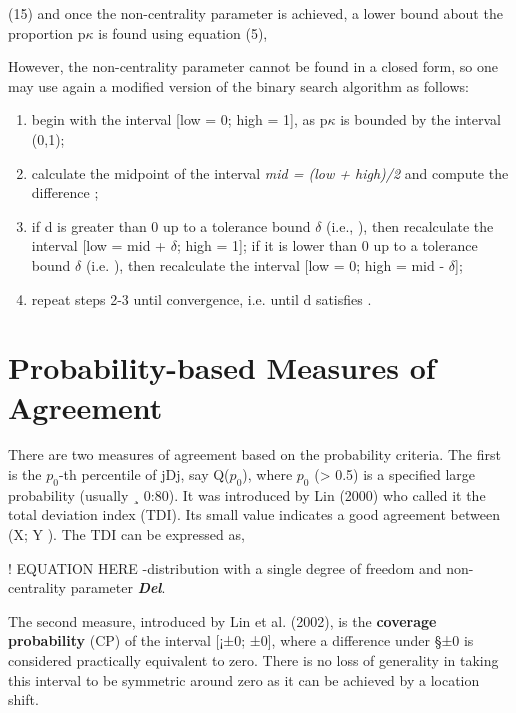 \documentclass[MAIN.tex]{subfiles}
\begin{document}
	(15)
	and once the non-centrality parameter  is achieved, a lower bound about the proportion p$\kappa$ is found using equation (5), 
	
	
	However, the non-centrality parameter cannot be found in a closed form, so one may use again a modified version of the binary search algorithm as follows:
	
	\begin{enumerate}
		\item begin with the interval [low = 0; high = 1], as p$\kappa$ is bounded by the interval (0,1);
		
		\item calculate the midpoint of the interval \textit{mid = (low + high)/2} and compute the difference ;
		
		\item if d is greater than 0 up to a tolerance bound $\delta$ (i.e., ), then recalculate the interval [low = mid + $\delta$; high = 1]; if it is 
		lower than 0 up to a tolerance bound $\delta$ (i.e. ), then recalculate the interval [low = 0; high = mid - $\delta$];
		
		\item repeat steps 2-3 until convergence, i.e. until d satisfies .
	\end{enumerate}
\newpage
\section{Probability-based Measures of Agreement}
There are two measures of agreement based on the probability criteria. The first is the
$p_0$-th percentile of jDj, say Q($p_0$), where $p_0$ (> 0.5) is a specified large probability (usually ¸ 0:80). 
It was introduced by Lin (2000) who called it the total deviation index (TDI). Its
small value indicates a good agreement between (X; Y ). The TDI can be expressed as,

! EQUATION HERE
-distribution with a single degree of freedom and non-centrality parameter \textbf{\textit{Del}}.


The second measure, introduced by Lin et al. (2002), is the \textbf{coverage probability} (CP) of
the interval [¡±0; ±0], where a difference under §±0 is considered practically equivalent to
zero. There is no loss of generality in taking this interval to be symmetric around zero as it
can be achieved by a location shift. 
\end{document}

